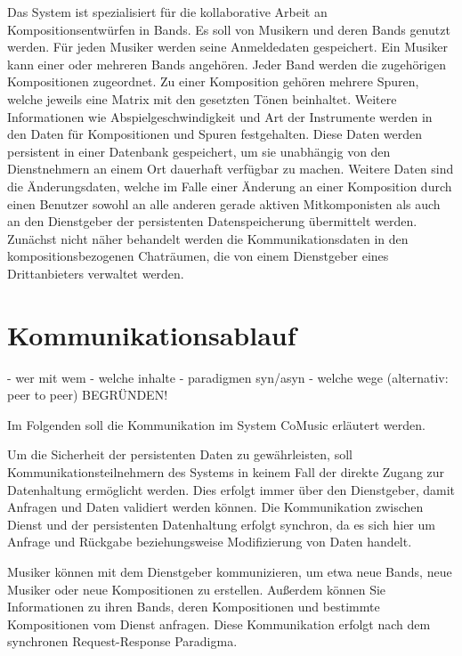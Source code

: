 \documentclass[12pt]{scrartcl}
\begin{document}
Das System ist spezialisiert für die kollaborative Arbeit an Kompositionsentwürfen in Bands. Es soll von Musikern und deren Bands genutzt werden. Für jeden Musiker werden seine Anmeldedaten gespeichert. Ein Musiker kann einer oder mehreren Bands angehören. Jeder Band werden die zugehörigen Kompositionen zugeordnet. Zu einer Komposition gehören mehrere Spuren, welche jeweils eine Matrix mit den gesetzten Tönen beinhaltet. Weitere Informationen wie Abspielgeschwindigkeit und Art der Instrumente werden in den Daten für Kompositionen und Spuren festgehalten. Diese Daten werden persistent in einer Datenbank gespeichert, um sie unabhängig von den Dienstnehmern an einem Ort dauerhaft verfügbar zu machen.
Weitere Daten sind die Änderungsdaten, welche im Falle einer Änderung an einer Komposition durch einen Benutzer sowohl an alle anderen gerade aktiven Mitkomponisten als auch an den Dienstgeber der persistenten Datenspeicherung übermittelt werden.
Zunächst nicht näher behandelt werden die Kommunikationsdaten in den kompositionsbezogenen Chaträumen, die von einem Dienstgeber eines Drittanbieters verwaltet werden.


\section{Kommunikationsablauf}


- wer mit wem
- welche inhalte
- paradigmen syn/asyn
- welche wege (alternativ: peer to peer)
BEGRÜNDEN!

Im Folgenden soll die Kommunikation im System CoMusic erläutert werden.

Um die Sicherheit der persistenten Daten zu gewährleisten, soll Kommunikationsteilnehmern des Systems in keinem Fall der direkte Zugang zur Datenhaltung ermöglicht werden. Dies erfolgt immer über den Dienstgeber, damit Anfragen und Daten validiert werden können. Die Kommunikation zwischen Dienst und der persistenten Datenhaltung erfolgt synchron, da es sich hier um Anfrage und Rückgabe beziehungsweise Modifizierung von Daten handelt.

Musiker können mit dem Dienstgeber kommunizieren, um etwa neue Bands, neue Musiker oder neue Kompositionen zu erstellen. Außerdem können Sie Informationen zu ihren Bands, deren Kompositionen und bestimmte Kompositionen vom Dienst anfragen. Diese Kommunikation erfolgt nach dem synchronen Request-Response Paradigma.
\end{document}
